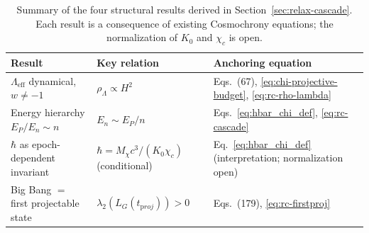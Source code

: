     \begin{table}[h]
      \centering
      \caption{Summary of the four structural results derived in Section~\ref{sec:relax-cascade}.
      Each result is a consequence of existing Cosmochrony equations; the normalization of $K_0$ and $\chi_c$ is open.}
      \label{tab:rc-summary}
      \begin{tabular}{lll}
        \hline
        Result & Key relation & Anchoring equation \\
        \hline
        $\Lambda_{\mathrm{eff}}$ dynamical, $w \neq -1$
        & $\rho_\Lambda \propto H^2$
        & Eqs.~(67), \eqref{eq:chi-projective-budget}, \eqref{eq:rc-rho-lambda} \\
        Energy hierarchy $E_P/E_n \sim n$
        & $E_n \sim E_P/n$
        & Eqs.~\eqref{eq:hbar_chi_def}, \eqref{eq:rc-cascade} \\
        $\hbar$ as epoch-dependent invariant
        & $\hbar = M_\chi c^3/(K_0\chi_c)$ (conditional)
        & Eq.~\eqref{eq:hbar_chi_def} (interpretation; normalization open) \\
        Big Bang $=$ first projectable state
        & $\lambda_2(L_G(t_{\mathrm proj})) > 0$
        & Eqs.~(179), \eqref{eq:rc-firstproj} \\
        \hline
      \end{tabular}
      \end{table}
